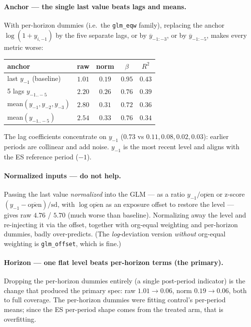 \documentclass[11pt]{article}
\begin{document}
\paragraph{Anchor --- the single last value beats lags and means.} With per-horizon dummies (i.e.\ the \texttt{glm\_eqw} family), replacing the anchor $\log(1+y_{i,-1})$ by the five separate lags, or by $\overline{y}_{-1:-3}$, or by $\overline{y}_{-1:-5}$, makes every metric worse:
\begin{center}\small
\begin{tabular}{lcccc}
\toprule
anchor & raw & norm & $\beta$ & $R^2$\\
\midrule
last $y_{-1}$ (baseline)      & $1.01$ & $0.19$ & $0.95$ & $0.43$\\
5 lags $y_{-1..-5}$           & $2.20$ & $0.26$ & $0.76$ & $0.39$\\
mean$(y_{-1},y_{-2},y_{-3})$  & $2.80$ & $0.31$ & $0.72$ & $0.36$\\
mean$(y_{-1..-5})$            & $2.54$ & $0.33$ & $0.76$ & $0.34$\\
\bottomrule
\end{tabular}
\end{center}
The lag coefficients concentrate on $y_{-1}$ ($0.73$ vs $0.11,0.08,0.02,0.03$): earlier periods are collinear and add noise. $y_{-1}$ is the most recent level and aligns with the ES reference period ($-1$).

\paragraph{Normalized inputs --- do not help.} Passing the last value \emph{normalized} into the GLM --- as a ratio $y_{-1}/\overline{\text{open}}$ or z-score $(y_{-1}-\overline{\text{open}})/\text{sd}$, with $\log\overline{\text{open}}$ as an exposure offset to restore the level --- gives raw $4.76$ / $5.70$ (much worse than baseline). Normalizing away the level and re-injecting it via the offset, together with org-equal weighting and per-horizon dummies, badly over-predicts. (The \emph{log}-deviation version \emph{without} org-equal weighting is \texttt{glm\_offset}, which is fine.)

\paragraph{Horizon --- one flat level beats per-horizon terms (the primary).} Dropping the per-horizon dummies entirely (a single post-period indicator) is the change that produced the primary spec: raw $1.01\!\to\!0.06$, norm $0.19\!\to\!0.06$, both to full coverage. The per-horizon dummies were fitting control's per-period means; since the ES per-period shape comes from the treated arm, that is overfitting.
\end{document}
